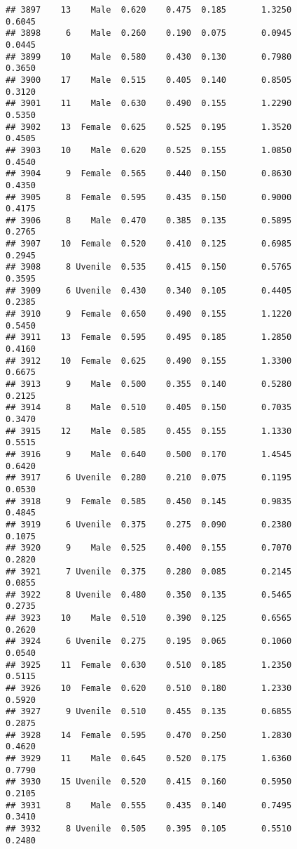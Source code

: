 \documentclass[
]{article}
\begin{document}
\begin{verbatim}
## 3897    13    Male  0.620    0.475  0.185       1.3250         0.6045
## 3898     6    Male  0.260    0.190  0.075       0.0945         0.0445
## 3899    10    Male  0.580    0.430  0.130       0.7980         0.3650
## 3900    17    Male  0.515    0.405  0.140       0.8505         0.3120
## 3901    11    Male  0.630    0.490  0.155       1.2290         0.5350
## 3902    13  Female  0.625    0.525  0.195       1.3520         0.4505
## 3903    10    Male  0.620    0.525  0.155       1.0850         0.4540
## 3904     9  Female  0.565    0.440  0.150       0.8630         0.4350
## 3905     8  Female  0.595    0.435  0.150       0.9000         0.4175
## 3906     8    Male  0.470    0.385  0.135       0.5895         0.2765
## 3907    10  Female  0.520    0.410  0.125       0.6985         0.2945
## 3908     8 Uvenile  0.535    0.415  0.150       0.5765         0.3595
## 3909     6 Uvenile  0.430    0.340  0.105       0.4405         0.2385
## 3910     9  Female  0.650    0.490  0.155       1.1220         0.5450
## 3911    13  Female  0.595    0.495  0.185       1.2850         0.4160
## 3912    10  Female  0.625    0.490  0.155       1.3300         0.6675
## 3913     9    Male  0.500    0.355  0.140       0.5280         0.2125
## 3914     8    Male  0.510    0.405  0.150       0.7035         0.3470
## 3915    12    Male  0.585    0.455  0.155       1.1330         0.5515
## 3916     9    Male  0.640    0.500  0.170       1.4545         0.6420
## 3917     6 Uvenile  0.280    0.210  0.075       0.1195         0.0530
## 3918     9  Female  0.585    0.450  0.145       0.9835         0.4845
## 3919     6 Uvenile  0.375    0.275  0.090       0.2380         0.1075
## 3920     9    Male  0.525    0.400  0.155       0.7070         0.2820
## 3921     7 Uvenile  0.375    0.280  0.085       0.2145         0.0855
## 3922     8 Uvenile  0.480    0.350  0.135       0.5465         0.2735
## 3923    10    Male  0.510    0.390  0.125       0.6565         0.2620
## 3924     6 Uvenile  0.275    0.195  0.065       0.1060         0.0540
## 3925    11  Female  0.630    0.510  0.185       1.2350         0.5115
## 3926    10  Female  0.620    0.510  0.180       1.2330         0.5920
## 3927     9 Uvenile  0.510    0.455  0.135       0.6855         0.2875
## 3928    14  Female  0.595    0.470  0.250       1.2830         0.4620
## 3929    11    Male  0.645    0.520  0.175       1.6360         0.7790
## 3930    15 Uvenile  0.520    0.415  0.160       0.5950         0.2105
## 3931     8    Male  0.555    0.435  0.140       0.7495         0.3410
## 3932     8 Uvenile  0.505    0.395  0.105       0.5510         0.2480

\end{verbatim}
\end{document}
